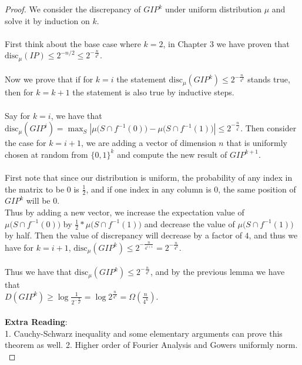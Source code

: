 \documentclass[11pt,oneside]{book}
\theoremstyle{plain}
\theoremstyle{definition}
\theoremstyle{plain}
\newcommand{\disc}{\mathrm{disc}}
\begin{document}
	\begin{proof}
		We consider the discrepancy of $GIP^k$ under uniform distribution $\mu$ and solve it by induction on $k$.\\
		\\
		First think about the base case where $k=2$, in Chapter 3 we have proven that $\disc_\mu(IP) \leq 2^{-n/2} \leq 2^{-\frac{n}{4^k}}$.\\
		\\
		Now we prove that if for $k = i$ the statement $\disc_\mu(GIP^k) \leq 2^{-\frac{n}{4^k}}$ stands true, then for $k = k+1$ the statement is also true by inductive steps.\\
		\\
		Say for $k = i$, we have that $\disc_\mu(GIP^i) = \max_{S} 
		\left| \mu\big( S \cap f^{-1}(0) \big) - \mu\big( S \cap f^{-1}(1)\big) \right| \leq 2^{-\frac{n}{4^i}}$. Then consider the case for $k = i+1$, we are adding a vector of dimension $n$ that is uniformly chosen at random from $\{0,1\}^k$ and compute the new result of $GIP^{k+1}$. \\
		\\
		First note that since our distribution is uniform, the probability of any index in the matrix to be $0$ is $\frac12$, and if one index in any column is $0$, the same position of $GIP^k$ will be $0$.\\
		Thus by adding a new vector, we increase the expectation value of $\mu\big( S \cap f^{-1}(0) \big)$ by $\frac12 * \mu\big( S \cap f^{-1}(1)\big)$ and decrease the value of $\mu\big( S \cap f^{-1}(1)\big)$ by half. Then the value of discrepancy will decrease by a factor of $4$, and thus we have for $k=i+1$, $\disc_\mu(GIP^k) \leq 2^{-\frac{n}{4^{i+1}}} = 2^{-\frac{n}{4^k}}$.\\
		\\
		Thus we have that $\disc_\mu(GIP^k) \leq 2^{-\frac{n}{4^k}}$, and by the previous lemma we have that\\
		$D(GIP^k) \ge  \log \frac{1}{2^{-\frac{n}{4^k}}} = \log {2^{\frac{n}{4^k}}} =\Omega(\frac{n}{4^k}) $.\\\
		 \\
		\textbf{Extra Reading}:\\
		1. Cauchy-Schwarz inequality and some elementary arguments can prove this theorem as well.
		2. Higher order of Fourier Analysis and Gowers uniformly norm.\\
	\end{proof}
	
	
	
\end{document}
